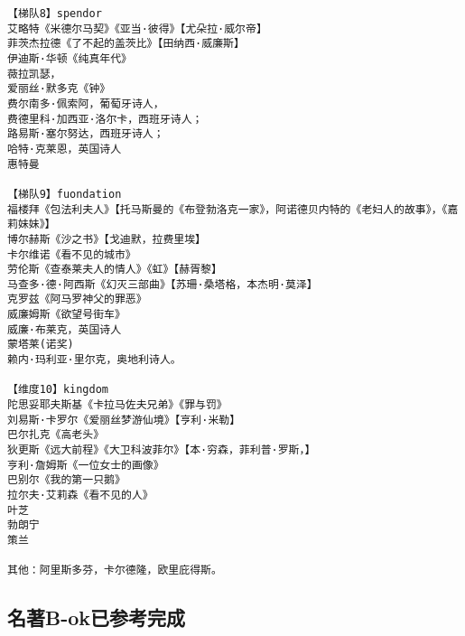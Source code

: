 \documentclass[UTF8]{../RepresentationUniverse}
\begin{document}
\begin{lstlisting}
【梯队8】spendor
艾略特《米德尔马契》《亚当·彼得》【尤朵拉·威尔帝】
菲茨杰拉德《了不起的盖茨比》【田纳西·威廉斯】
伊迪斯·华顿《纯真年代》
薇拉凯瑟，
爱丽丝·默多克《钟》
费尔南多·佩索阿，葡萄牙诗人，
费德里科·加西亚·洛尔卡，西班牙诗人；
路易斯·塞尔努达，西班牙诗人；
哈特·克莱恩，英国诗人
惠特曼

【梯队9】fuondation
福楼拜《包法利夫人》【托马斯曼的《布登勃洛克一家》，阿诺德贝内特的《老妇人的故事》，《嘉莉妹妹》】
博尔赫斯《沙之书》【戈迪默，拉费里埃】
卡尔维诺《看不见的城市》
劳伦斯《查泰莱夫人的情人》《虹》【赫胥黎】
马查多·德·阿西斯《幻灭三部曲》【苏珊·桑塔格，本杰明·莫泽】
克罗兹《阿马罗神父的罪恶》
威廉姆斯《欲望号街车》
威廉·布莱克，英国诗人
蒙塔莱(诺奖) 
赖内·玛利亚·里尔克，奥地利诗人。

【维度10】kingdom
陀思妥耶夫斯基《卡拉马佐夫兄弟》《罪与罚》
刘易斯·卡罗尔《爱丽丝梦游仙境》【亨利·米勒】
巴尔扎克《高老头》
狄更斯《远大前程》《大卫科波菲尔》【本·穷森，菲利普·罗斯，】
亨利·詹姆斯《一位女士的画像》
巴别尔《我的第一只鹅》
拉尔夫·艾莉森《看不见的人》
叶芝
勃朗宁
策兰

其他：阿里斯多芬，卡尔德隆，欧里庇得斯。
\end{lstlisting}


\subsection{名著B-ok已参考完成}
\end{document}
